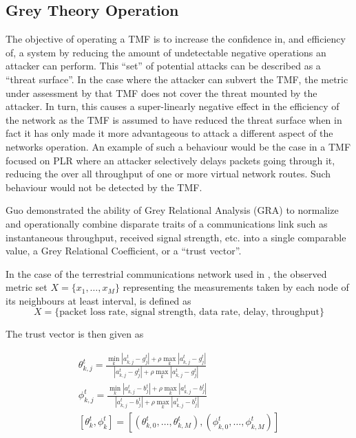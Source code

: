 \documentclass[runningheads,a4paper]{llncs}
\begin{document}
\subsection{Grey Theory Operation}

The objective of operating a TMF is to increase the confidence in, and efficiency of, a system by reducing the amount of undetectable negative operations an attacker can perform.
This ``set'' of potential attacks can be described as a ``threat surface''.
In the case where the attacker can subvert the TMF, the metric under assessment by that TMF does not cover the threat mounted by the attacker.
In turn, this causes a super-linearly negative effect in the efficiency of the network as the TMF is assumed to have reduced the threat surface when in fact it has only made it more advantageous to attack a different aspect of the networks operation.
An example of such a behaviour would be the case in a TMF focused on PLR where an attacker selectively delays packets going through it, reducing the over all throughput of one or more virtual network routes.
Such behaviour would not be detected by the TMF.

Guo\cite{Guo2012} demonstrated the ability of Grey Relational Analysis (GRA)\cite{Zuo1995} to normalize and operationally combine disparate traits of a communications link such as instantaneous throughput, received signal strength, etc. into a single comparable value, a Grey Relational Coefficient, or a ``trust vector''.

In the case of the terrestrial communications network used in \cite{Guo2012}, the observed metric set $X = \{x_1,\dots,x_M\}$ representing the measurements taken by each node of its neighbours at least interval, is defined as 
\begin{equation}
  \label{eq:terrmetrics}
  X=\{\text{packet loss rate, signal strength, data rate, delay, throughput}\}
\end{equation}

The trust vector is then given as

\begin{align}
  \label{eq:grc}
  \theta_{k,j}^t = \frac{\min_k|a_{k,j}^t - g_j^t| + \rho \max_k|a_{k,j}^t-g_j^t|}{|a_{k,j}^t-g_j^t| + \rho \max_k|a_{k,j}^t-g_j^t|} \\
  \phi_{k,j}^t = \frac{\min_k|a_{k,j}^t - b_j^t| + \rho \max_k|a_{k,j}^t-b_j^t|}{|a_{k,j}^t-b_j^t| + \rho \max_k|a_{k,j}^t-b_j^t|}  \\
  [\theta_k^t, \phi_k^t] = [(\theta_{k,0}^t,\dots,\theta_{k,M}^t),(\phi_{k,0}^t,\dots,\phi_{k,M}^t )]
\end{align}
\end{document}
